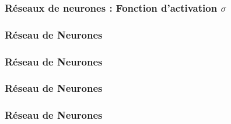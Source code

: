 \documentclass{formation}
\begin{document}
\begin{frame}
  \frametitle{Réseaux de neurones : Fonction d'activation $\sigma$}
\end{frame}

\begin{frame}
  \frametitle{Réseau de Neurones}
\end{frame}

\begin{frame}
  \frametitle{Réseau de Neurones}
\end{frame}

\begin{frame}
  \frametitle{Réseau de Neurones}
\end{frame}

\begin{frame}
  \frametitle{Réseau de Neurones}
\end{frame}
\end{document}
